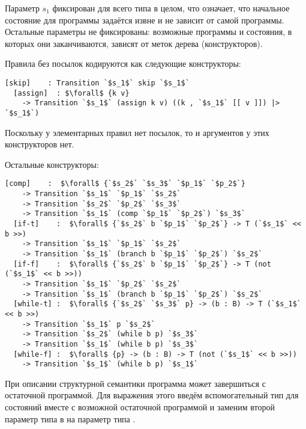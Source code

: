  Параметр $s_1$ фиксирован для всего типа в целом, что означает, что начальное состояние для программы задаётся извне и не зависит от самой программы. Остальные параметры не фиксированы: возможные программы и состояния, в которых они заканчиваются, зависят от меток дерева (конструкторов).

  Правила без посылок кодируются как следующие конструкторы:
  \begin{lstlisting}[mathescape]
  [skip]    : Transition `$s_1$` skip `$s_1$`
  [assign]  : $\forall$ {k v}
    -> Transition `$s_1$` (assign k v) ((k , `$s_1$` [[ v ]]) |> `$s_1$`)
  \end{lstlisting}
  Поскольку у элементарных правил нет посылок, то и аргументов у этих конструкторов нет.

  Остальные конструкторы:
  \begin{lstlisting}[mathescape]
  [comp]    :  $\forall$ {`$s_2$` `$s_3$` `$p_1$` `$p_2$`}
    -> Transition `$s_1$` `$p_1$` `$s_2$`
    -> Transition `$s_2$` `$p_2$` `$s_3$`
    -> Transition `$s_1$` (comp `$p_1$` `$p_2$`) `$s_3$`
  [if-t]    :  $\forall$ {`$s_2$` b `$p_1$` `$p_2$`} -> T (`$s_1$` << b >>)
    -> Transition `$s_1$` `$p_1$` `$s_2$`
    -> Transition `$s_1$` (branch b `$p_1$` `$p_2$`) `$s_2$`
  [if-f]    :  $\forall$ {`$s_2$` b `$p_1$` `$p_2$`} -> T (not (`$s_1$` << b >>))
    -> Transition `$s_1$` `$p_2$` `$s_2$`
    -> Transition `$s_1$` (branch b `$p_1$` `$p_2$`) `$s_2$`
  [while-t] :  $\forall$ {`$s_2$` `$s_3$` p} -> (b : B) -> T (`$s_1$` << b >>)
    -> Transition `$s_1$` p `$s_2$`
    -> Transition `$s_2$` (while b p) `$s_3$`
    -> Transition `$s_1$` (while b p) `$s_3$`
  [while-f] :  $\forall$ {p} -> (b : B) -> T (not (`$s_1$` << b >>))
    -> Transition `$s_1$` (while b p) `$s_1$`
  \end{lstlisting}

  При описании структурной семантики программа может завершиться с остаточной программой. Для выражения этого введём вспомогательный тип  для состояний вместе с возможной остаточной программой и заменим второй параметр типа  в  на параметр типа .

